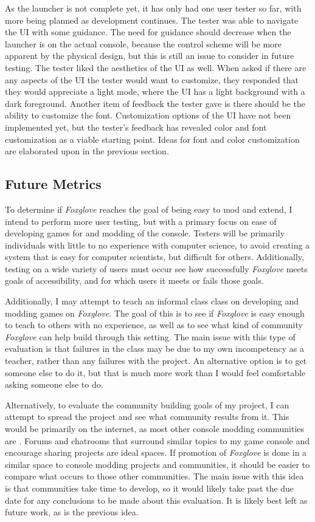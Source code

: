 \documentclass[10pt,twocolumn]{article}
\begin{document}
As the launcher is not complete yet, it has only had one user tester so far,
with more being planned as development continues. The tester was able to
navigate the UI with some guidance. The need for guidance should decrease when
the launcher is on the actual console, because the control scheme will be more
apparent by the physical design, but this is still an issue to consider in
future testing. The tester liked the aesthetics of the UI as well. When asked
if there are any aspects of the UI the tester would want to customize, they
responded that they would appreciate a light mode, where the UI has a light
background with a dark foreground. Another item of feedback the tester gave is
there should be the ability to customize the font. Customization options of the
UI have not been implemented yet, but the tester's feedback has revealed color
and font customization as a viable starting point. Ideas for font and color
customization are elaborated upon in the previous section.

\subsection{Future Metrics}

To determine if \textit{Foxglove} reaches the goal of being easy to mod and
extend, I intend to perform more user testing, but with a primary focus on ease
of developing games for and modding of the console. Testers will be primarily
individuals with little to no experience with computer science, to avoid
creating a system that is easy for computer scientists,
but difficult for others. Additionally, testing on a wide variety of users must
occur see how successfully \textit{Foxglove} meets goals of accessibility, and
for which users it meets or fails those goals.

Additionally, I may attempt to teach an informal class
class on developing and modding games on \textit{Foxglove}. The goal of this is
to see if \textit{Foxglove} is easy enough to teach to others with no
experience, as well as to see what kind of community \textit{Foxglove} can help
build through this setting. The main issue with this type of evaluation is that
failures in the class may be due to my own incompetency as a teacher, rather
than any failures with the project. An alternative option is to get someone else
to do it, but that is much more work than I would feel comfortable asking
someone else to do.

Alternatively, to evaluate the community building goals of my project, I can
attempt to spread the project and see what community results from it. This would
be primarily on the internet, as most other console modding communities are
\cite{brown_why_2022}. Forums and chatrooms that surround similar topics to my
game console and encourage sharing projects are ideal spaces. If promotion of
\textit{Foxglove} is done in a similar space to console modding projects and
communities, it should be easier to compare what occurs to those other
communities. The main issue with this idea is that communities take time to
develop, so it would likely take past the due date for any conclusions to be
made about this evaluation. It is likely best left as future work, as is the
previous idea.
\end{document}
